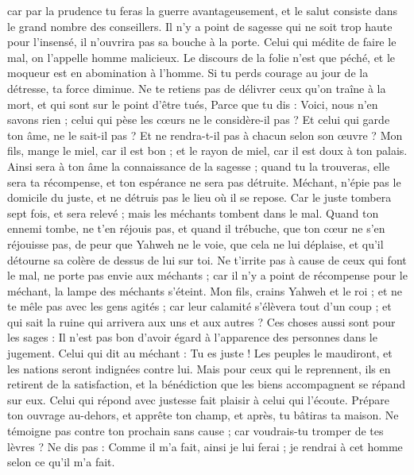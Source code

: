 \begin{multicols}{2}
car par la prudence tu feras la guerre avantageusement, et le salut consiste dans le grand nombre des conseillers.
Il n'y a point de sagesse qui ne soit trop haute pour l'insensé, il n'ouvrira pas sa bouche à la porte.
Celui qui médite de faire le mal, on l'appelle homme malicieux.
Le discours de la folie n'est que péché, et le moqueur est en abomination à l'homme.
Si tu perds courage au jour de la détresse, ta force diminue.
Ne te retiens pas de délivrer ceux qu'on traîne à la mort, et qui sont sur le point d'être tués,
Parce que tu dis : Voici, nous n'en savons rien ; celui qui pèse les cœurs ne le considère-il pas ? Et celui qui garde ton âme, ne le sait-il pas ? Et ne rendra-t-il pas à chacun selon son œuvre ?
Mon fils, mange le miel, car il est bon ; et le rayon de miel, car il est doux à ton palais.
Ainsi sera à ton âme la connaissance de la sagesse ; quand tu la trouveras, elle sera ta récompense, et ton espérance ne sera pas détruite.
Méchant, n'épie pas le domicile du juste, et ne détruis pas le lieu où il se repose.
Car le juste tombera sept fois, et sera relevé ; mais les méchants tombent dans le mal.
Quand ton ennemi tombe, ne t'en réjouis pas, et quand il trébuche, que ton cœur ne s'en réjouisse pas,
de peur que Yahweh ne le voie, que cela ne lui déplaise, et qu'il détourne sa colère de dessus de lui sur toi.
Ne t'irrite pas à cause de ceux qui font le mal, ne porte pas envie aux méchants ;
car il n'y a point de récompense pour le méchant, la lampe des méchants s'éteint.
Mon fils, crains Yahweh et le roi ; et ne te mêle pas avec les gens agités ;
car leur calamité s'élèvera tout d'un coup ; et qui sait la ruine qui arrivera  aux uns et aux autres ?
Ces choses aussi sont pour les sages : Il n'est pas bon d'avoir égard à l'apparence des personnes dans le jugement.
Celui qui dit au méchant : Tu es juste ! Les peuples le maudiront, et les nations seront indignées contre lui.
Mais pour ceux qui le reprennent, ils en retirent de la satisfaction, et la bénédiction que les biens accompagnent se répand sur eux.
Celui qui répond avec justesse fait plaisir à celui qui l'écoute.
Prépare ton ouvrage au-dehors, et apprête ton champ, et après, tu bâtiras ta maison.
Ne témoigne pas contre ton prochain sans cause ; car voudrais-tu tromper de tes lèvres ?
Ne dis pas : Comme il m'a fait, ainsi je lui ferai ; je rendrai à cet homme selon ce qu'il m'a fait.

\end{multicols}
